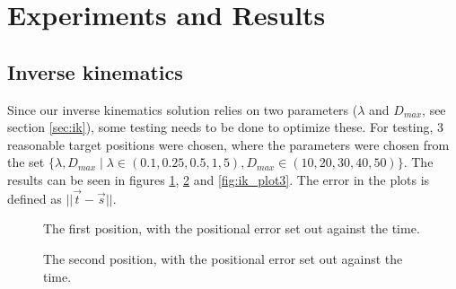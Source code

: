\documentclass[a4paper]{article}
\begin{document}
\section{Experiments and Results}

\subsection{Inverse kinematics}
\FloatBarrier
Since our inverse kinematics solution relies on two parameters
($\lambda$ and $D_{max}$, see section \ref{sec:ik}), some testing needs to be
done to optimize these. For testing, 3 reasonable target positions were chosen,
where the parameters were chosen from the set $\{\lambda, D_{max} \mid \lambda \in
  (0.1, 0.25, 0.5, 1, 5), D_{max} \in (10, 20, 30, 40, 50)\}$. The results can be
seen in figures \ref{fig:ik_plot1}, \ref{fig:ik_plot2} and \ref{fig:ik_plot3}.
The error in the plots is defined as $|| \vec{t} - \vec{s} ||$.

\begin{figure}[htbp]
  \centering
  \caption{The first position, with the positional error set out against
         the time.}
  \label{fig:ik_plot1}
\end{figure}

\begin{figure}[htbp]
  \centering
  \caption{The second position, with the positional error set out against
         the time.}
  \label{fig:ik_plot2}
\end{figure}
\end{document}
